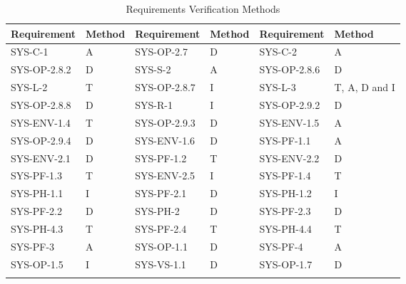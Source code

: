 \begin{table}[htb]
\centering
\caption{Requirements Verification Methods}
\label{tab:verification}
\begin{tabular}{ll :ll:ll}
\toprule
\textbf{Requirement} & \textbf{Method} & \textbf{Requirement} & \textbf{Method} & \textbf{Requirement} & \textbf{Method}\\ \midrule
SYS-C-1                 &A                       &SYS-OP-2.7              &D &SYS-C-2                 &A \\\hdashline                      
SYS-OP-2.8.2            &D &SYS-S-2                 &A                       &SYS-OP-2.8.6            &D \\\hdashline
SYS-L-2                 &T                       &SYS-OP-2.8.7            &I    &SYS-L-3                 &T, A, D and I  \\\hdashline            
SYS-OP-2.8.8            &D  &SYS-R-1                 &I                       &SYS-OP-2.9.2            &D \\\hdashline
SYS-ENV-1.4             &T                       &SYS-OP-2.9.3            &D &SYS-ENV-1.5             &A   \\\hdashline                    
SYS-OP-2.9.4            &D &SYS-ENV-1.6             &D                       &SYS-PF-1.1              &A      \\\hdashline
SYS-ENV-2.1             &D                       &SYS-PF-1.2              &T         & SYS-ENV-2.2             &D       \\\hdashline                
SYS-PF-1.3              &T          &SYS-ENV-2.5             &I                       &SYS-PF-1.4              &T          \\\hdashline
SYS-PH-1.1              &I                       &SYS-PF-2.1              &D &SYS-PH-1.2              &I     \\\hdashline                  
SYS-PF-2.2              &D &SYS-PH-2                &D                       &SYS-PF-2.3              &D \\\hdashline
SYS-PH-4.3              &T                       &SYS-PF-2.4              &T          &SYS-PH-4.4              &T       \\\hdashline                
SYS-PF-3                &A      &SYS-OP-1.1              &D                       &SYS-PF-4                &A      \\\hdashline
SYS-OP-1.5              &I                       &SYS-VS-1.1              &D &SYS-OP-1.7              &D       \\\hdashline                

\end{tabular}
\end{table}
